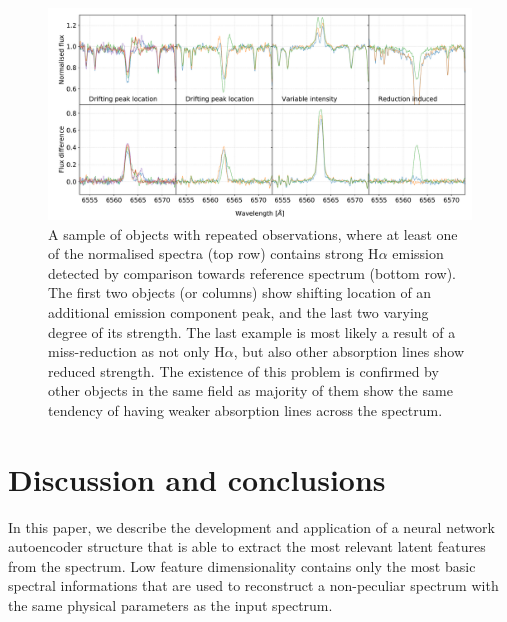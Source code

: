 \begin{figure}
	\centering
	\includegraphics[width=\textwidth]{repetas_spectra_spectra_ccd3.pdf}
	\caption{A sample of objects with repeated observations, where at least one of the normalised spectra (top row) contains strong H$\alpha$ emission detected by comparison towards reference spectrum (bottom row). The first two objects (or columns) show shifting location of an additional emission component peak, and the last two varying degree of its strength. The last example is most likely a result of a miss-reduction as not only H$\alpha$, but also other absorption lines show reduced strength. The existence of this problem is confirmed by other objects in the same field as majority of them show the same tendency of having weaker absorption lines across the spectrum.}
	\label{fig:temporal_variab}
\end{figure}

\section{Discussion and conclusions}
\label{sec:discussion_emis} 
In this paper, we describe the development and application of a neural network autoencoder structure that is able to extract the most relevant latent features from the spectrum. Low feature dimensionality contains only the most basic spectral informations that are used to reconstruct a non-peculiar spectrum with the same physical parameters as the input spectrum.

